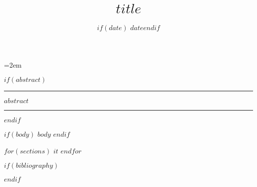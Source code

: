 \documentclass[%
  letterpaper,%
  twocolumn,%
  $if(lang)$$lang$$else$english$endif$%
]{article}
\title{$title$}
\date{$if(date)$\vspace*{1em} $date$$endif$}
\begin{document}
\maketitle

\thispagestyle{fancy}
\parindent=2em


$if(abstract)$
\hrule height 1pt
\vspace{1ex}%
{\parindent=0pt \normalfont\sffamily\normalsize $abstract$}
\vspace{1ex}%
\hrule height 1pt
\vspace{1ex}
$endif$

$if(body)$
$body$
$endif$

$for(sections)$
$it$
$endfor$

$if(bibliography)$
\footnotesize


\normalsize
$endif$


\end{document}
